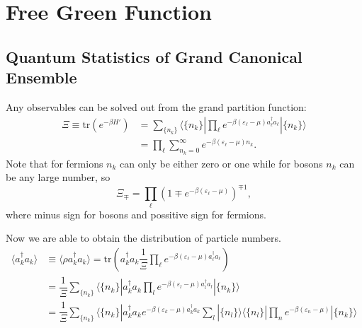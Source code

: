 \documentclass[b5paper,10pt,UTF8]{book}
\numberwithin{equation}{section}
\begin{document}
	\section{Free Green Function}
		\subsection{Quantum Statistics of Grand Canonical Ensemble}
		Any observables can be solved out from the grand partition function:
		\begin{align*}
			\varXi\equiv\mathrm{tr}(e^{-\beta H'})&=\sum_{\{n_k\}}\langle\{n_k\}|\prod_{\ell}e^{-\beta(\varepsilon_\ell-\mu)a_\ell^\dagger a_\ell}|\{n_k\}\rangle\\
			&=\prod_{\ell}\sum_{n_k=0}^\infty e^{-\beta(\varepsilon_\ell-\mu)n_k}.
		\end{align*}
		Note that for fermions $n_k$ can only be either zero or one while for bosons $n_k$ can be any large number, so 
		\begin{equation}\label{2.3.14}
			\varXi_{\mp}=\prod_\ell(1\mp e^{-\beta(\varepsilon_\ell-\mu)})^{\mp1},
		\end{equation}
		where minus sign for bosons and possitive sign for fermions.\par
		Now we are able to obtain the distribution of particle numbers.
		\begin{align*}
			\langle a_k^\dagger a_k\rangle&\equiv\langle\rho a_k^\dagger a_k\rangle=\mathrm{tr}\left(a_k^\dagger a_k\dfrac{1}{\varXi}\prod_\ell e^{-\beta(\varepsilon_\ell-\mu)a_\ell^\dagger a_\ell}\right)\\
			&=\dfrac{1}{\varXi}\sum_{\{n_k\}}\langle\{n_k\}|a_k^\dagger a_k\prod_l e^{-\beta(\varepsilon_l-\mu)a_l^\dagger a_l}|\{n_k\}\rangle\\
			&=\dfrac{1}{\varXi}\sum_{\{n_k\}}\langle\{n_k\}|a_k^\dagger a_k e^{-\beta(\varepsilon_k-\mu)a_k^\dagger a_k}\sum_l|\{n_l\}\rangle\langle\{n_l\}|\prod_n e^{-\beta(\varepsilon_n-\mu)}|\{n_k\}\rangle
		\end{align*}
\end{document}
